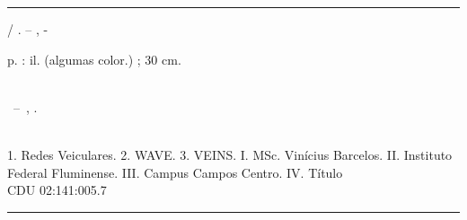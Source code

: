 \documentclass[
12pt,				%
openright,			%
oneside,			%
a4paper,			%
brazil,				%
]{abntex2}
\begin{document}
	
	\frenchspacing 
	
	
	\imprimircapa
	
	\imprimirfolhaderosto*
	
	
	\begin{fichacatalografica}
		\vspace*{\fill}					%
		\hrule							%
		\begin{center}					%
			\begin{minipage}[c]{12.5cm}		%
				
				\imprimirautor
				
				\hspace{0.5cm} \imprimirtitulo  / \imprimirautor. --
				\imprimirlocal, \imprimirdata-
				
				\hspace{0.5cm} \pageref{LastPage} p. : il. (algumas color.) ; 30 cm.\\
				
				\hspace{0.5cm} \imprimirorientadorRotulo~\imprimirorientador\\
				
				\hspace{0.5cm}
				\parbox[t]{\textwidth}{\imprimirtipotrabalho~--~\imprimirinstituicao,
					\imprimirdata.}\\
				
				\hspace{0.5cm}
				1. Redes Veiculares.
				2. WAVE.
				3. VEINS.
				I. MSc. Vinícius Barcelos.
				II. Instituto Federal Fluminense.
				III. Campus Campos Centro.
				IV. Título\\ 			
				
				\hspace{8.75cm} CDU 02:141:005.7\\
				
			\end{minipage}
		\end{center}
		\hrule
	\end{fichacatalografica}
	
\end{document}
